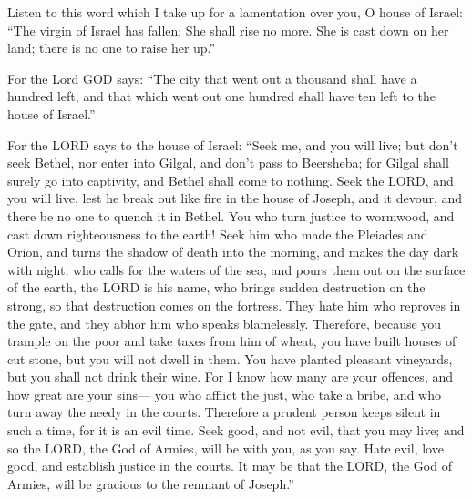  Listen to this word which I take up for a lamentation over
you, O house of Israel:  ``The virgin of Israel has fallen;
She shall rise no more. She is cast down on her land; there is no one to
raise her up.''

 For the Lord GOD says: ``The city that went out a thousand
shall have a hundred left, and that which went out one hundred shall
have ten left to the house of Israel.''

 For the LORD says to the house of Israel: ``Seek me, and
you will live;  but don't seek Bethel, nor enter into
Gilgal, and don't pass to Beersheba; for Gilgal shall surely go into
captivity, and Bethel shall come to nothing.  Seek the LORD,
and you will live, lest he break out like fire in the house of Joseph,
and it devour, and there be no one to quench it in Bethel. 
You who turn justice to wormwood, and cast down righteousness to the
earth!  Seek him who made the Pleiades and Orion, and turns
the shadow of death into the morning, and makes the day dark with night;
who calls for the waters of the sea, and pours them out on the surface
of the earth, the LORD is his name,  who brings sudden
destruction on the strong, so that destruction comes on the fortress.
 They hate him who reproves in the gate, and they abhor him
who speaks blamelessly.  Therefore, because you trample on
the poor and take taxes from him of wheat, you have built houses of cut
stone, but you will not dwell in them. You have planted pleasant
vineyards, but you shall not drink their wine.  For I know
how many are your offences, and how great are your sins--- you who
afflict the just, who take a bribe, and who turn away the needy in the
courts.  Therefore a prudent person keeps silent in such a
time, for it is an evil time.  Seek good, and not evil,
that you may live; and so the LORD, the God of Armies, will be with you,
as you say.  Hate evil, love good, and establish justice in
the courts. It may be that the LORD, the God of Armies, will be gracious
to the remnant of Joseph.''

